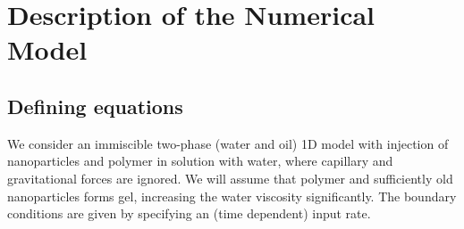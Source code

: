 \documentclass[nanomaterials,article,submit,moreauthors,pdftex]{Definitions/mdpi}
\begin{document}



\appendix
\section{Description of the Numerical Model}
\unskip
\subsection{Defining equations}
We consider an immiscible two-phase (water and oil) 1D model with injection of nanoparticles and polymer in solution with water, where capillary and gravitational forces are ignored. We will assume that polymer and sufficiently old nanoparticles forms gel, increasing the water viscosity significantly. The boundary conditions are given by specifying an (time dependent) input rate. 
\end{document}
